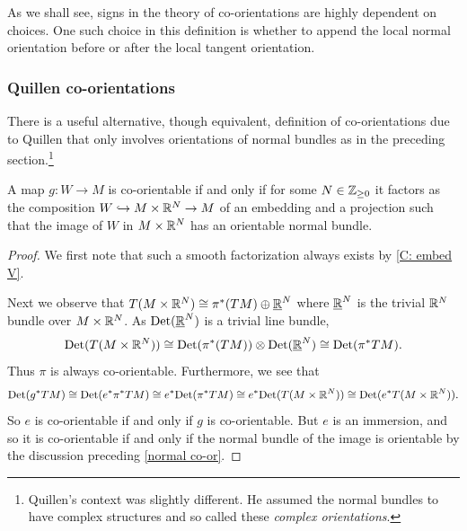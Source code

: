 As we shall see, signs in the theory of co-orientations are highly dependent on choices.
One such choice in this definition is whether to append the local normal orientation before or after the local tangent orientation.

\subsubsection{Quillen co-orientations}\label{S: Quillen}

There is a useful alternative, though equivalent, definition of co-orientations due to Quillen \cite{Quil71} that only involves orientations of normal bundles as in the preceding section.\footnote{Quillen's context was slightly different.
	He assumed the normal bundles to have complex structures and so called these \textit{complex orientations}.}

\begin{lemma}\label{L: Quillen}
	A map $g \colon W \to M$ is co-orientable if and only if for some $N \in \mathbb{Z}_{\geq 0}$ it factors as the composition $W \hookrightarrow M \times \mathbb{R}^N \to M$ of an embedding and a projection such that the image of $W$ in $M \times \mathbb{R}^N$ has an orientable normal bundle.
\end{lemma}

\begin{proof}
	We first note that such a smooth factorization always exists by \cref{C: embed V}.

	Next we observe that $T(M \times \mathbb{R}^N) \cong \pi^*(TM) \oplus \underline{\mathbb{R}}^N$ where $\underline{\mathbb{R}}^N$ is the trivial $\mathbb{R}^N$ bundle over $M \times \mathbb{R}^N$.
	As ${\rm Det}( \underline{\mathbb{R}}^N)$ is a trivial line bundle,
	\begin{equation*}
		{\rm Det}(T(M \times \mathbb{R}^N)) \cong {\rm Det}(\pi^*(TM)) \otimes {\rm Det}(\underline{\mathbb{R}}^N) \cong {\rm Det}(\pi^*TM).
	\end{equation*}
	Thus $\pi$ is always co-orientable.
	Furthermore, we see that
	\begin{equation*}
		{\rm Det}(g^*TM) \cong {\rm Det}(e^*\pi^*TM) \cong e^*{\rm Det}(\pi^*TM) \cong e^*{\rm Det}(T(M \times \mathbb{R}^N)) \cong {\rm Det}(e^*T(M \times \mathbb{R}^N)).
	\end{equation*}
	So $e$ is co-orientable if and only if $g$ is co-orientable.
	But $e$ is an immersion, and so it is co-orientable if and only if the normal bundle of the image is orientable by the discussion preceding \cref{normal co-or}.
\end{proof}

